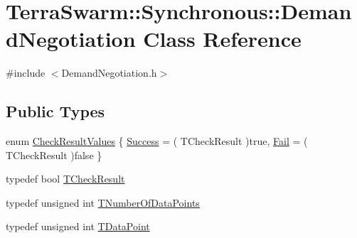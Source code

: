 \hypertarget{class_terra_swarm_1_1_synchronous_1_1_demand_negotiation}{\section{Terra\-Swarm\-:\-:Synchronous\-:\-:Demand\-Negotiation Class Reference}
\label{class_terra_swarm_1_1_synchronous_1_1_demand_negotiation}
}


{\ttfamily \#include $<$Demand\-Negotiation.\-h$>$}

\subsection*{Public Types}
\begin{DoxyCompactItemize}
\item 
enum \hyperlink{class_terra_swarm_1_1_synchronous_1_1_demand_negotiation_a62e3d42f7a50e61a19ac2bc6349c302d}{Check\-Result\-Values} \{ \hyperlink{class_terra_swarm_1_1_synchronous_1_1_demand_negotiation_a62e3d42f7a50e61a19ac2bc6349c302da3a190a1e60e673508e7d0b752edada78}{Success} = ( T\-Check\-Result )true, 
\hyperlink{class_terra_swarm_1_1_synchronous_1_1_demand_negotiation_a62e3d42f7a50e61a19ac2bc6349c302da172b152bb4bc982cf5d623de5a1e696d}{Fail} = ( T\-Check\-Result )false
 \}
\item 
typedef bool \hyperlink{class_terra_swarm_1_1_synchronous_1_1_demand_negotiation_abf70719cd7b70d3eeecb1949bc2157a3}{T\-Check\-Result}
\item 
typedef unsigned int \hyperlink{class_terra_swarm_1_1_synchronous_1_1_demand_negotiation_aeaaae7fc1861d9af2bff4c9dcb4d89ac}{T\-Number\-Of\-Data\-Points}
\item 
typedef unsigned int \hyperlink{class_terra_swarm_1_1_synchronous_1_1_demand_negotiation_a6660353fa0a65775070bba8571a76e3d}{T\-Data\-Point}
\end{DoxyCompactItemize}
